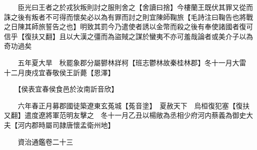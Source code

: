 　　臣光曰王者之於戎狄叛則討之服則舍之【舍讀曰捨】今樓蘭王既伏其罪又從而誅之後有叛者不可得而懷矣必以為有罪而討之則宜陳師鞠旅【毛詩注曰鞠告也將戰之日陳其師旅誓告之也】明致其罰今乃遣使者誘以金幣而殺之後有奉使諸國者復可信乎【復扶又翻】且以大漢之彊而為盜賊之謀於蠻夷不亦可羞哉論者或美介子以為奇功過矣

　　五年夏大旱　秋罷象郡分屬鬰林牂柯【班志鬱林故秦桂林郡】冬十一月大雷　十二月庚戍宜春敬侯王訢薨【恩澤】

　　【侯表宜春侯食邑於汝南訢音欣】

　　六年春正月募郡國徒築遼東玄菟城【菟音塗】　夏赦天下　烏桓復犯塞【復扶又翻】遣度遼將軍范明友擊之　冬十一月乙丑以楊敞為丞相少府河内蔡義為御史大夫【河内郡時屬司隷唐懷孟衛州地】

　　資治通鑑卷二十三  
    


 


 



 

 
  







 


　　
　　
　
　
　


　　

　















	
	









































